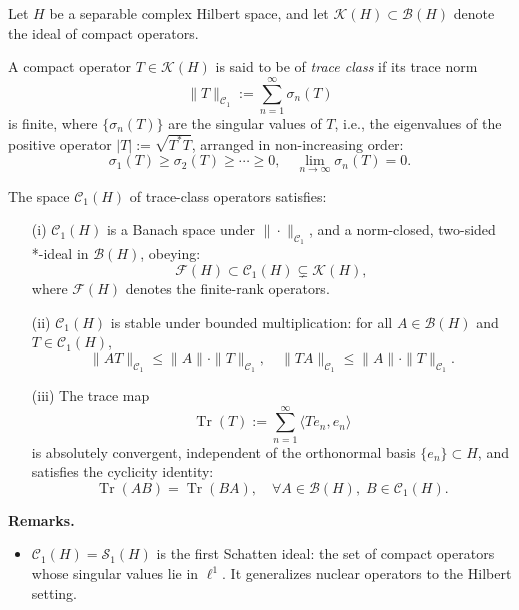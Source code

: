 \begin{definition}\label{def:trace_class_operator}
Let \( H \) be a separable complex Hilbert space, and let \( \mathcal{K}(H) \subset \mathcal{B}(H) \) denote the ideal of compact operators.

A compact operator \( T \in \mathcal{K}(H) \) is said to be of \emph{trace class} if its trace norm
\[
\| T \|_{\mathcal{C}_1} := \sum_{n=1}^\infty \sigma_n(T)
\]
is finite, where \( \{\sigma_n(T)\} \) are the singular values of \( T \), i.e., the eigenvalues of the positive operator \( |T| := \sqrt{T^* T} \), arranged in non-increasing order:
\[
\sigma_1(T) \ge \sigma_2(T) \ge \cdots \ge 0, \quad \lim_{n \to \infty} \sigma_n(T) = 0.
\]

The space \( \mathcal{C}_1(H) \) of trace-class operators satisfies:

\begin{enumerate}
    \item[\textup{(i)}] \( \mathcal{C}_1(H) \) is a Banach space under \( \| \cdot \|_{\mathcal{C}_1} \), and a norm-closed, two-sided *-ideal in \( \mathcal{B}(H) \), obeying:
    \[
    \mathcal{F}(H) \subset \mathcal{C}_1(H) \subsetneq \mathcal{K}(H),
    \]
    where \( \mathcal{F}(H) \) denotes the finite-rank operators.

    \item[\textup{(ii)}] \( \mathcal{C}_1(H) \) is stable under bounded multiplication: for all \( A \in \mathcal{B}(H) \) and \( T \in \mathcal{C}_1(H) \),
    \[
    \| A T \|_{\mathcal{C}_1} \le \|A\| \cdot \|T\|_{\mathcal{C}_1}, \quad
    \| T A \|_{\mathcal{C}_1} \le \|A\| \cdot \|T\|_{\mathcal{C}_1}.
    \]

    \item[\textup{(iii)}] The trace map
    \[
    \operatorname{Tr}(T) := \sum_{n=1}^\infty \langle T e_n, e_n \rangle
    \]
    is absolutely convergent, independent of the orthonormal basis \( \{ e_n \} \subset H \), and satisfies the cyclicity identity:
    \[
    \operatorname{Tr}(AB) = \operatorname{Tr}(BA), \quad \forall A \in \mathcal{B}(H),\; B \in \mathcal{C}_1(H).
    \]
\end{enumerate}

\medskip
\noindent\textbf{Remarks.}
\begin{itemize}
    \item \( \mathcal{C}_1(H) = \mathcal{S}_1(H) \) is the first Schatten ideal: the set of compact operators whose singular values lie in \( \ell^1 \). It generalizes nuclear operators to the Hilbert setting.


\end{itemize}
\end{definition}
